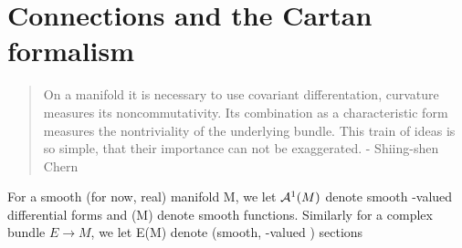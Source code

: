 \section{Connections and the Cartan formalism}
\begin{quotation}
 On a manifold it is necessary to use covariant differentation, curvature measures its noncommutativity. Its combination 
as a characteristic form measures the nontriviality of the underlying bundle. This train of ideas is so simple, that their
importance can not be exaggerated. - Shiing-shen Chern
\end{quotation}

For a smooth (for now, real) manifold M, we let $\AA(M)$ denote smooth \Cbb-valued differential forms and \AAA(M) denote
smooth functions. Similarly for a complex bundle $E \to M$, we let E(M) denote (smooth, \Cbb-valued ) sections
